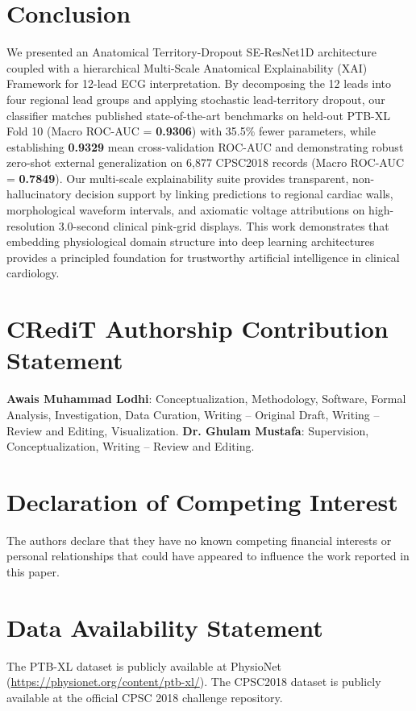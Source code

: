 \documentclass[12pt]{elsarticle}
\begin{document}
\section{Conclusion}
\label{sec:conclusion}
We presented an Anatomical Territory-Dropout SE-ResNet1D architecture coupled with a hierarchical Multi-Scale Anatomical Explainability (XAI) Framework for 12-lead ECG interpretation. By decomposing the 12 leads into four regional lead groups and applying stochastic lead-territory dropout, our classifier matches published state-of-the-art benchmarks on held-out PTB-XL Fold 10 (Macro ROC-AUC = \textbf{0.9306}) with 35.5\% fewer parameters, while establishing \textbf{0.9329} mean cross-validation ROC-AUC and demonstrating robust zero-shot external generalization on 6,877 CPSC2018 records (Macro ROC-AUC = \textbf{0.7849}). Our multi-scale explainability suite provides transparent, non-hallucinatory decision support by linking predictions to regional cardiac walls, morphological waveform intervals, and axiomatic voltage attributions on high-resolution 3.0-second clinical pink-grid displays. This work demonstrates that embedding physiological domain structure into deep learning architectures provides a principled foundation for trustworthy artificial intelligence in clinical cardiology.

\section*{CRediT Authorship Contribution Statement}
\textbf{Awais Muhammad Lodhi}: Conceptualization, Methodology, Software, Formal Analysis, Investigation, Data Curation, Writing -- Original Draft, Writing -- Review and Editing, Visualization.
\textbf{Dr. Ghulam Mustafa}: Supervision, Conceptualization, Writing -- Review and Editing.

\section*{Declaration of Competing Interest}
The authors declare that they have no known competing financial interests or personal relationships that could have appeared to influence the work reported in this paper.

\section*{Data Availability Statement}
The PTB-XL dataset is publicly available at PhysioNet (\url{https://physionet.org/content/ptb-xl/}). The CPSC2018 dataset is publicly available at the official CPSC 2018 challenge repository.

\clearpage


\end{document}
